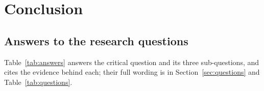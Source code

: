 
\chapter{Conclusion}
\label{ch:conclusion}

\section{Answers to the research questions}
\label{sec:answers}

Table~\ref{tab:answers} answers the critical question and its three sub-questions, and cites the evidence behind each; their full wording is in Section~\ref{sec:questions} and Table~\ref{tab:questions}.

